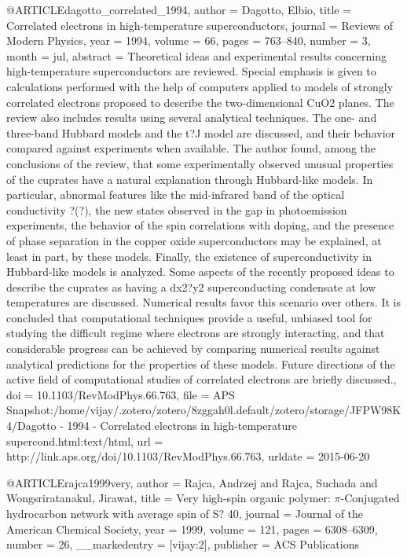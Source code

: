 @ARTICLE{dagotto_correlated_1994,
  author = {Dagotto, Elbio},
  title = {Correlated electrons in high-temperature superconductors},
  journal = {Reviews of Modern Physics},
  year = {1994},
  volume = {66},
  pages = {763--840},
  number = {3},
  month = jul,
  abstract = {Theoretical ideas and experimental results concerning high-temperature
	superconductors are reviewed. Special emphasis is given to calculations
	performed with the help of computers applied to models of strongly
	correlated electrons proposed to describe the two-dimensional CuO2
	planes. The review also includes results using several analytical
	techniques. The one- and three-band Hubbard models and the t?J model
	are discussed, and their behavior compared against experiments when
	available. The author found, among the conclusions of the review,
	that some experimentally observed unusual properties of the cuprates
	have a natural explanation through Hubbard-like models. In particular,
	abnormal features like the mid-infrared band of the optical conductivity
	?(?), the new states observed in the gap in photoemission experiments,
	the behavior of the spin correlations with doping, and the presence
	of phase separation in the copper oxide superconductors may be explained,
	at least in part, by these models. Finally, the existence of superconductivity
	in Hubbard-like models is analyzed. Some aspects of the recently
	proposed ideas to describe the cuprates as having a dx2?y2 superconducting
	condensate at low temperatures are discussed. Numerical results favor
	this scenario over others. It is concluded that computational techniques
	provide a useful, unbiased tool for studying the difficult regime
	where electrons are strongly interacting, and that considerable progress
	can be achieved by comparing numerical results against analytical
	predictions for the properties of these models. Future directions
	of the active field of computational studies of correlated electrons
	are briefly discussed.},
  doi = {10.1103/RevModPhys.66.763},
  file = {APS Snapshot:/home/vijay/.zotero/zotero/8zggah0l.default/zotero/storage/JFPW98K4/Dagotto - 1994 - Correlated electrons in high-temperature supercond.html:text/html},
  url = {http://link.aps.org/doi/10.1103/RevModPhys.66.763},
  urldate = {2015-06-20}
}

@ARTICLE{rajca1999very,
  author = {Rajca, Andrzej and Rajca, Suchada and Wongsriratanakul, Jirawat},
  title = {Very high-spin organic polymer: $\pi$-Conjugated hydrocarbon network
	with average spin of S? 40},
  journal = {Journal of the American Chemical Society},
  year = {1999},
  volume = {121},
  pages = {6308--6309},
  number = {26},
  __markedentry = {[vijay:2]},
  publisher = {ACS Publications}
}

